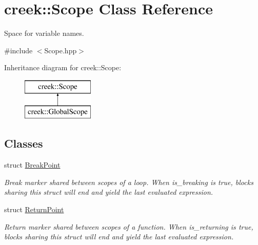 \hypertarget{classcreek_1_1_scope}{}\section{creek\+:\+:Scope Class Reference}
\label{classcreek_1_1_scope}


Space for variable names.  




{\ttfamily \#include $<$Scope.\+hpp$>$}

Inheritance diagram for creek\+:\+:Scope\+:\begin{figure}[H]
\begin{center}
\leavevmode
\includegraphics[height=2.000000cm]{classcreek_1_1_scope}
\end{center}
\end{figure}
\subsection*{Classes}
\begin{DoxyCompactItemize}
\item 
struct \hyperlink{structcreek_1_1_scope_1_1_break_point}{Break\+Point}
\begin{DoxyCompactList}\small\item\em Break marker shared between scopes of a loop. When {\ttfamily is\+\_\+breaking} is {\ttfamily true}, blocks sharing this struct will end and yield the last evaluated expression. \end{DoxyCompactList}\item 
struct \hyperlink{structcreek_1_1_scope_1_1_return_point}{Return\+Point}
\begin{DoxyCompactList}\small\item\em Return marker shared between scopes of a function. When {\ttfamily is\+\_\+returning} is {\ttfamily true}, blocks sharing this struct will end and yield the last evaluated expression. \end{DoxyCompactList}\end{DoxyCompactItemize}
